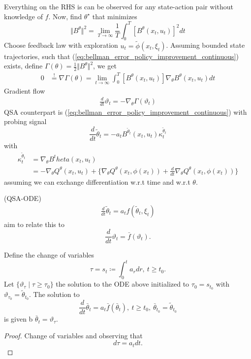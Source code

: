 Everything on the RHS is can be observed for any state-action pair without knowledge of \(f\).
Now, find \(\theta^\star\) that minimizes
\[\Vert B^\theta\Vert^2=\lim_{T\to\infty}\frac{1}{T}\int_0^T[B^\theta(x_t,u_t)]^2dt\]
Choose feedback law with exploration \(u_t=\tilde{\phi}(x_t,\xi_t)\). Assuming
bounded state trajectories, such that (\ref{eq:bellman_error_policy_improvement_continuous}) exists,
define \(\Gamma(\theta)=\frac{1}{2}\Vert B^\theta\Vert^2\), we get 
\begin{align*}
    0&\stackrel{!}{=}\nabla\Gamma(\theta)=\lim_{t\to\infty}\int_0^T\left[B^\theta(x_t,u_t)\right]\nabla_\theta B^\theta(x_t,u_t)dt
\end{align*}
Gradient flow 
\begin{align*}
    \frac{d}{dt}\vartheta_t=-\nabla_\theta\Gamma(\vartheta_t)
\end{align*}
QSA counterpart is (\ref{eq:bellman_error_policy_improvement_continuous})
with probing signal 
\[\frac{d}{dt}\tilde{\theta}_t=-a_tB^{\tilde{\theta}_t}(x_t,u_t)\kappa_t^{\tilde{\theta}_t}\]
with 
\begin{align*}
    \kappa_t^{\tilde{\theta}_t}&=\nabla_\theta B^theta(x_t,u_t)\\
    &=-\nabla_\theta Q^\theta(x_t,u_t)+\{\nabla_\theta Q^\theta(x_t,\phi(x_t))+ \frac{d}{dt}\nabla_\theta Q^\theta(x_t,\phi(x_t))\}
\end{align*}
assuming we can exchange differentiation w.r.t time and w.r.t \(\theta\).

(QSA-ODE)
\begin{align*}
    \frac{d}{dt}\tilde{\theta}_t=a_tf(\tilde{\theta}_t,\xi_t)
\end{align*}
aim to relate this to 
\[\frac{d}{dt}\vartheta_t=\bar{f}(\vartheta_t).\]
\begin{lemma}\label{lem:35}
    Define the change of variables 
    \[\tau=s_t\coloneqq\int_0^t a_rdr,\ t\geq t_0.\]
    Let \(\{\vartheta_\tau\mid\tau\geq \tau_0\}\) the solution to 
    the ODE above initialized to \(\tau_0=s_{t_0}\) with \(\vartheta_{\tau_0}=\tilde{\theta}_{t_0}\).
    The solution to 
    \[\frac{d}{dt}\bar{\theta}_t=a_t\bar{f}(\bar{\theta}_t),\ t\geq t_0,\ \bar{\theta}_{t_0}=\tilde{\theta}_{t_0}\]
    is given b \(\bar{\theta}_t=\vartheta_\tau\).
\end{lemma}
\begin{proof}
    Change of variables and observing that \[d\tau=a_tdt.\]
\end{proof}
